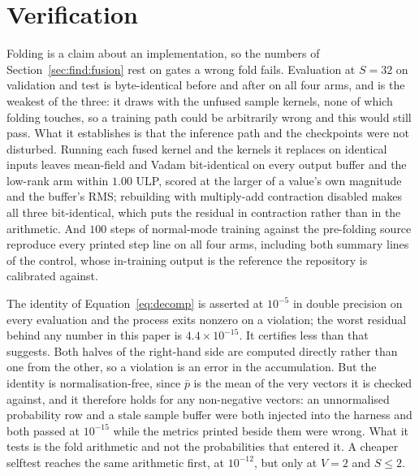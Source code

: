 \section{Verification}
\label{sec:verification}


Folding is a claim about an implementation, so the numbers of
Section~\ref{sec:find:fusion} rest on gates a wrong fold fails. Evaluation at
$S = 32$ on validation and test is byte-identical before and after on all four arms,
and is the weakest of the three: it draws with the unfused sample kernels, none of
which folding touches, so a training path could be arbitrarily wrong and this would
still pass. What it establishes is that the inference path and the
checkpoints were not disturbed. Running each fused kernel and the kernels it replaces
on identical inputs leaves mean-field and Vadam bit-identical on every output buffer
and the low-rank arm within $1.00$ ULP, scored at the larger of a value's own
magnitude and the buffer's RMS; rebuilding with multiply-add contraction disabled
makes all three bit-identical, which puts the residual in contraction rather than in
the arithmetic. And $100$ steps of normal-mode training against the pre-folding source
reproduce every printed step line on all four arms, including both summary lines of
the control, whose in-training output is the reference the repository is calibrated
against.

The identity of Equation~\ref{eq:decomp} is asserted at $10^{-5}$ in double precision
on every evaluation and the process exits nonzero on a violation; the worst residual
behind any number in this paper is $4.4 \times 10^{-15}$. It certifies less than that
suggests. Both halves of the right-hand side are computed directly rather than one
from the other, so a violation is an error in the accumulation. But the identity is
normalisation-free, since $\bar{p}$ is the mean of the very vectors it is checked
against, and it therefore holds for any non-negative vectors: an unnormalised
probability row and a stale sample buffer were both injected into the harness and both
passed at $10^{-15}$ while the metrics printed beside them were wrong. What it tests
is the fold arithmetic and not the probabilities that entered it. A cheaper selftest
reaches the same arithmetic first, at $10^{-12}$, but only at $V = 2$ and $S \leq 2$.
